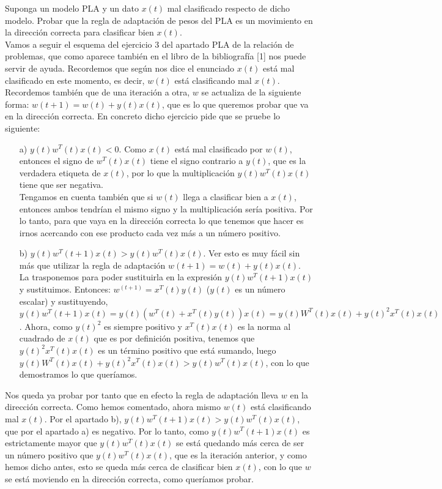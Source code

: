\documentclass[12pt]{article}
\theoremstyle{definition}
\begin{document}
\begin{pregunta}
Suponga un modelo PLA y un dato $x(t)$ mal clasificado respecto de dicho modelo. Probar que la regla de adaptación de pesos del PLA es un movimiento en la dirección correcta para clasificar bien $x(t)$.\\

Vamos a seguir el esquema del ejercicio 3 del apartado PLA de la relación de problemas, que como aparece también en el libro de la bibliografía [1] nos puede servir de ayuda. Recordemos que según nos dice el enunciado $x(t)$ está mal clasificado en este momento, es decir, $w(t)$ está clasificando mal $x(t)$. Recordemos también que de una iteración a otra, $w$ se actualiza de la siguiente forma: $w(t+1) = w(t)+y(t)x(t)$, que es lo que queremos probar que va en la dirección correcta. En concreto dicho ejercicio pide que se pruebe lo siguiente:
\begin{enumerate}
\item[a)] $y(t)w^T(t)x(t) < 0$. Como $x(t)$ está mal clasificado por $w(t)$, entonces el signo de $w^T(t)x(t)$ tiene el signo contrario a $y(t)$, que es la verdadera etiqueta de $x(t)$, por lo que la multiplicación $y(t)w^T(t)x(t)$ tiene que ser negativa.\\ 
Tengamos en cuenta también que si $w(t)$ llega a clasificar bien a $x(t)$, entonces ambos tendrían el mismo signo y la multiplicación sería positiva. Por lo tanto, para que vaya en la dirección correcta lo que tenemos que hacer es irnos acercando con ese producto cada vez más a un número positivo.
\item[b)] $y(t)w^T(t+1)x(t)>y(t)w^T(t)x(t)$. Ver esto es muy fácil sin más que utilizar la regla de adaptación $w(t+1) = w(t)+y(t)x(t)$. La trasponemos para poder sustituirla en la expresión $y(t)w^T(t+1)x(t)$ y sustituimos. Entonces: $w^(t+1) = x^T(t)y(t)$ ($y(t)$ es un número escalar) y sustituyendo, $y(t)w^T(t+1)x(t) = y(t)(w^T(t)+x^T(t)y(t))x(t) = y(t)W^T(t)x(t) + y(t)^2x^T(t)x(t)$. Ahora, como $y(t)^2$ es siempre positivo y $x^T(t)x(t)$ es la norma al cuadrado de $x(t)$ que es por definición positiva, tenemos que $y(t)^2x^T(t)x(t)$ es un término positivo que está sumando, luego $y(t)W^T(t)x(t) + y(t)^2x^T(t)x(t) > y(t)w^T(t)x(t)$, con lo que demostramos lo que queríamos.
\end{enumerate}
Nos queda ya probar por tanto que en efecto la regla de adaptación lleva $w$ en la dirección correcta. Como hemos comentado, ahora mismo $w(t)$ está clasificando mal $x(t)$. Por el apartado b), $y(t)w^T(t+1)x(t) > y(t)w^T(t)x(t)$, que por el apartado a) es negativo. Por lo tanto, como  $y(t)w^T(t+1)x(t)$ es estrictamente mayor que $y(t)w^T(t)x(t)$ se está quedando más cerca de ser un número positivo que $y(t)w^T(t)x(t)$, que es la iteración anterior, y como hemos dicho antes, esto se queda más cerca de clasificar bien $x(t)$, con lo que $w$ se está moviendo en la dirección correcta, como queríamos probar.
\end{pregunta}
\end{document}
